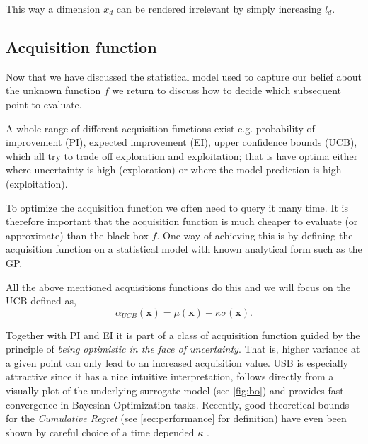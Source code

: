 \documentclass[conference,compsoc]{IEEEtran}
\theoremstyle{definition}
\begin{document}
            \noindent This way a dimension $x_d$ can be rendered irrelevant by simply increasing $l_d$.

    \subsection{Acquisition function}\label{sec:acq}
    
        Now that we have discussed the statistical model used to capture our belief about the unknown function $f$ we return to discuss how to decide which subsequent point to evaluate.

        A whole range of different acquisition functions exist e.g. probability of improvement (PI),
        expected improvement (EI), upper confidence bounds (UCB), which all try to trade off exploration and exploitation;
        that is have optima either where uncertainty is high (exploration) or where the model prediction is high (exploitation).

        To optimize the acquisition function we often need to query it many time.
        It is therefore important that the acquisition function is much cheaper to evaluate (or approximate) than the black box $f$.
        One way of achieving this is by defining the acquisition function on a statistical model with known analytical form such as the GP.

        All the above mentioned acquisitions functions do this and we will focus on the UCB defined as,
            \begin{equation}
                \alpha_{UCB}(\bm{x}) = \mu(\bm{x}) + \kappa \sigma(\bm{x}).
            \end{equation}

        Together with PI and EI it is part of a class of acquisition function guided by the principle of \emph{being optimistic in the face of uncertainty}.
        That is, higher variance at a given point can only lead to an increased acquisition value.
        USB is especially attractive since it has a nice intuitive interpretation, follows directly from a visually plot of the underlying surrogate model (see \cref{fig:bo}) and provides fast convergence in Bayesian Optimization tasks. %
        Recently, good theoretical bounds for the \emph{Cumulative Regret} (see \cref{sec:performance} for definition) have even been shown by careful choice of a time depended $\kappa$ \parencite{srinivas_gaussian_2012}.
\end{document}
